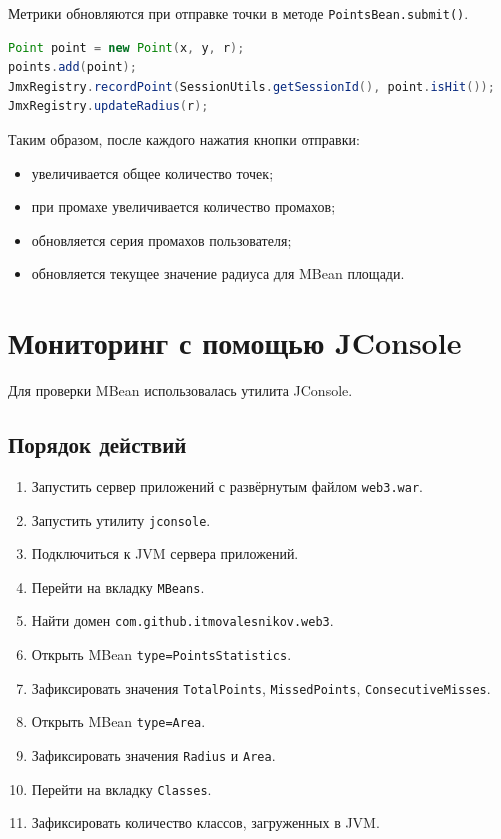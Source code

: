 \documentclass[a4paper,11pt]{article}
\begin{document}
Метрики обновляются при отправке точки в методе \texttt{PointsBean.submit()}.

\begin{lstlisting}[language=Java]
Point point = new Point(x, y, r);
points.add(point);
JmxRegistry.recordPoint(SessionUtils.getSessionId(), point.isHit());
JmxRegistry.updateRadius(r);
\end{lstlisting}

Таким образом, после каждого нажатия кнопки отправки:
\begin{itemize}
    \item увеличивается общее количество точек;
    \item при промахе увеличивается количество промахов;
    \item обновляется серия промахов пользователя;
    \item обновляется текущее значение радиуса для MBean площади.
\end{itemize}

\section{Мониторинг с помощью JConsole}

Для проверки MBean использовалась утилита JConsole.

\subsection{Порядок действий}

\begin{enumerate}
    \item Запустить сервер приложений с развёрнутым файлом \texttt{web3.war}.
    \item Запустить утилиту \texttt{jconsole}.
    \item Подключиться к JVM сервера приложений.
    \item Перейти на вкладку \texttt{MBeans}.
    \item Найти домен \texttt{com.github.itmovalesnikov.web3}.
    \item Открыть MBean \texttt{type=PointsStatistics}.
    \item Зафиксировать значения \texttt{TotalPoints}, \texttt{MissedPoints}, \texttt{ConsecutiveMisses}.
    \item Открыть MBean \texttt{type=Area}.
    \item Зафиксировать значения \texttt{Radius} и \texttt{Area}.
    \item Перейти на вкладку \texttt{Classes}.
    \item Зафиксировать количество классов, загруженных в JVM.
\end{enumerate}
\end{document}
